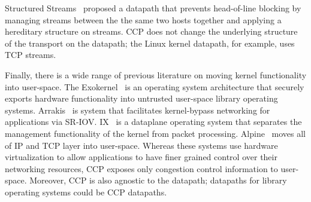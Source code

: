 Structured Streams~\cite{structuredstreams} proposed a datapath that prevents head-of-line blocking by managing streams between the the same two hosts together and applying a hereditary structure on streams. CCP does not change the underlying structure of the transport on the datapath; the Linux kernel datapath, for example, uses TCP streams. 

Finally, there is a wide range of previous literature on moving kernel functionality into user-space. 
The Exokernel~\cite{exokernel} is an operating system architecture that securely
exports hardware functionality into untrusted user-space library operating systems.  
Arrakis~\cite{arrakis2014} is system that facilitates kernel-bypass networking for applications via SR-IOV. 
IX~\cite{ix} is a dataplane operating system that separates the management functionality of the kernel from packet processing. 
Alpine~\cite{alpine} moves all of IP and TCP layer into user-space.
Whereas these systems use hardware virtualization to allow applications to have finer grained control over their networking resources,
CCP exposes only congestion control information to user-space. 
Moreover, CCP is also agnostic to the datapath; datapaths for library operating systems could be CCP datapaths.
